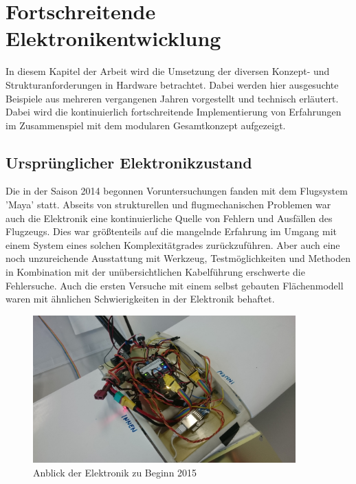 \chapter{Fortschreitende Elektronikentwicklung}\label{cha:Elektronikentwicklung}

In diesem Kapitel der Arbeit wird die Umsetzung der diversen Konzept- und Strukturanforderungen in Hardware betrachtet. Dabei werden hier ausgesuchte Beispiele aus mehreren vergangenen Jahren vorgestellt und technisch erläutert.
Dabei wird die kontinuierlich fortschreitende Implementierung von Erfahrungen im Zusammenspiel mit dem modularen Gesamtkonzept aufgezeigt.

\section{Ursprünglicher Elektronikzustand}

Die in der Saison 2014 begonnen Voruntersuchungen fanden mit dem Flugsystem 'Maya' statt.
Abseits von strukturellen und flugmechanischen Problemen war auch die Elektronik eine kontinuierliche Quelle von Fehlern und Ausfällen des Flugzeugs.
Dies war größtenteils auf die mangelnde Erfahrung im Umgang mit einem System eines solchen Komplexitätgrades zurückzuführen. Aber auch eine noch unzureichende Ausstattung mit Werkzeug, Testmöglichkeiten und Methoden in Kombination mit der unübersichtlichen Kabelführung erschwerte die Fehlersuche.
Auch die ersten Versuche mit einem selbst gebauten Flächenmodell waren mit ähnlichen Schwierigkeiten in der Elektronik behaftet.

\begin{figure}[H]
\centering
\includegraphics[width=0.9\textwidth]{bilder/Fotos/Elektronik_Kabelsalat_2015.jpg} 
\caption{Anblick der Elektronik zu Beginn 2015} 
\label{Anblick der Elektronik zu Beginn 2015}
\end{figure}

